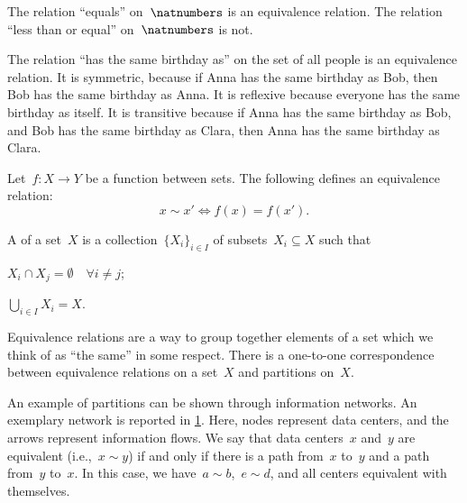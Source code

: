 \begin{example}
    The relation ``equals'' on~$\natnumbers$ is an equivalence relation. The relation ``less than or equal'' on~$\natnumbers$ is not.
\end{example}

\begin{example}
    The relation ``has the same birthday as'' on the set of all people is an equivalence relation. It is symmetric, because if Anna has the same birthday as Bob, then Bob has the same birthday as Anna. It is reflexive because everyone has the same birthday as itself. It is transitive because if Anna has the same birthday as Bob, and Bob has the same birthday as Clara, then Anna has the same birthday as Clara.
\end{example}

\begin{example}
    Let~$f\colon X\to Y$ be a function between sets. The following defines an equivalence relation:
    \begin{equation*}
        x\sim x'\Leftrightarrow f(x)=f(x').
    \end{equation*}
\end{example}

\begin{definition}[Partition]
    \label{def:partition}
    A \emph{} of a set~$X$ is a collection~$\{X_i\}_{i\in I}$ of subsets~$X_i\subseteq X$ such that
    \begin{compactenum}
        \item $X_i\cap X_j=\emptyset \quad \forall i\neq j$;
        \item $\bigcup_{i\in I}X_i=X$.
    \end{compactenum}
\end{definition}

\begin{remark}
    Equivalence relations are a way to group together elements of a set which we think of as ``the same'' in some respect. There is a one-to-one correspondence between equivalence relations on a set~$X$ and partitions on~$X$.
\end{remark}

\begin{example}
    An example of partitions can be shown through information networks. An exemplary network is reported in \cref{fig:info_network}. Here, nodes represent data centers, and the arrows represent information flows. We say that data centers~$x$ and~$y$ are equivalent (i.e.,~$x\sim y$) if and only if there is a path from~$x$ to~$y$ and a path from~$y$ to~$x$. In this case, we have~$a\sim b$,~$e\sim d$, and all centers equivalent with themselves.
\end{example}

\begin{figure}[h!]
    \begin{center}
    \end{center}
    \caption{\label{fig:info_network}}
\end{figure}
